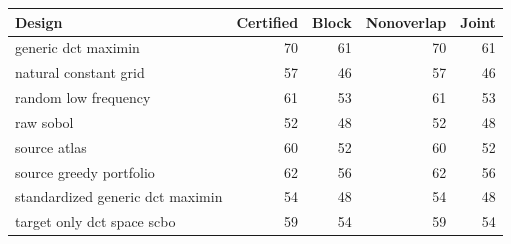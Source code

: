 \begin{tabular}{lrrrr}
\toprule
Design & Certified & Block & Nonoverlap & Joint \\
\midrule
generic dct maximin & 70 & 61 & 70 & 61 \\
natural constant grid & 57 & 46 & 57 & 46 \\
random low frequency & 61 & 53 & 61 & 53 \\
raw sobol & 52 & 48 & 52 & 48 \\
source atlas & 60 & 52 & 60 & 52 \\
source greedy portfolio & 62 & 56 & 62 & 56 \\
standardized generic dct maximin & 54 & 48 & 54 & 48 \\
target only dct space scbo & 59 & 54 & 59 & 54 \\
\bottomrule
\end{tabular}

